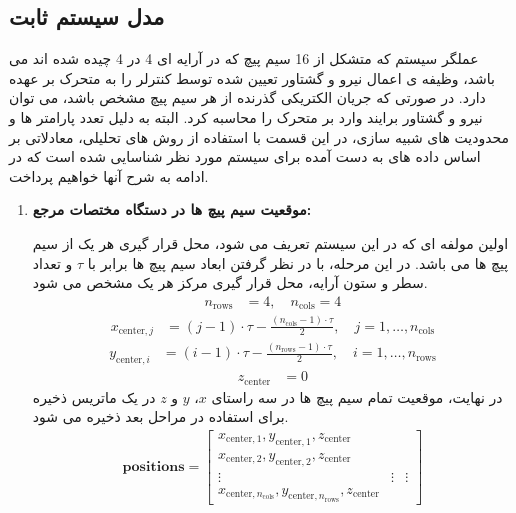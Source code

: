 \subsection{مدل سیستم ثابت}
\label{subsec:method-stator-model}
عملگر سیستم که متشکل از 16 سیم پیچ که در آرایه ای 4 در 4 چیده شده اند می باشد، وظیفه ی اعمال نیرو و گشتاور تعیین شده توسط کنترلر را به متحرک بر عهده دارد. در صورتی که جریان الکتریکی گذرنده از هر سیم پیچ مشخص باشد، می توان نیرو و گشتاور برایند وارد بر متحرک را محاسبه کرد. البته به دلیل تعدد پارامتر ها و محدودیت های شبیه سازی، در این قسمت با استفاده از روش های تحلیلی، معادلاتی بر اساس داده های به دست آمده برای سیستم مورد نظر شناسایی شده است که در ادامه به شرح آنها خواهیم پرداخت.
\begin{enumerate}
	\item\textbf{ موقعیت سیم پیچ ها در دستگاه مختصات مرجع:}
	
	اولین مولفه ای که در این سیستم تعریف می شود، محل قرار گیری هر یک از سیم پیچ ها می باشد. در این مرحله، با در نظر گرفتن ابعاد سیم پیچ ها برابر با $\tau$ و تعداد سطر و ستون آرایه، محل قرار گیری مرکز هر یک مشخص می شود.  
	\begin{align}
		n_{\text{rows}} &= 4, \quad n_{\text{cols}} = 4
		\label{eq:method-grid-params}
	\end{align}
	\begin{align}
		x_{\text{center}, j} &= (j - 1) \cdot \tau - \frac{(n_{\text{cols}} - 1) \cdot \tau}{2}, \quad j = 1, \dots, n_{\text{cols}}
		\label{eq:method-xcenter}
	\end{align}
	\begin{align}
		y_{\text{center}, i} &= (i - 1) \cdot \tau - \frac{(n_{\text{rows}} - 1) \cdot \tau}{2}, \quad i = 1, \dots, n_{\text{rows}}
		\label{eq:method-ycenter}
	\end{align}
	\begin{align}
		z_{\text{center}} &= 0
		\label{eq:method-zcenter}
	\end{align}
	در نهایت، موقعیت تمام سیم پیچ ها در سه راستای $x$، $y$ و $z$ در یک ماتریس ذخیره برای استفاده در مراحل بعد ذخیره می شود.
	\begin{align}
		\mathbf{positions} =
		\begin{bmatrix}
			x_{\text{center}, 1}, y_{\text{center}, 1}, z_{\text{center}} \\
			x_{\text{center}, 2}, y_{\text{center}, 2}, z_{\text{center}} \\
			\vdots & \vdots & \vdots \\
			x_{\text{center}, n_{\text{cols}}}, y_{\text{center}, n_{\text{rows}}}, z_{\text{center}}
		\end{bmatrix}
		\label{eq:method-position-matrix}
	\end{align}
	

\end{enumerate}
